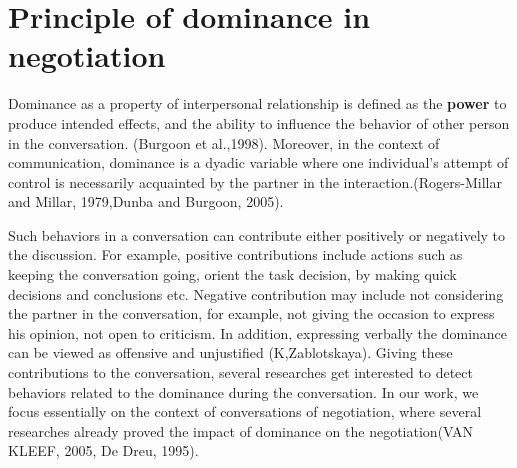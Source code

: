 \documentclass{article}
\begin{document}
%		
%		
	

	
	\section{Principle of dominance in negotiation}
	\par Dominance as a property of interpersonal relationship is defined as the \textbf{power} to produce intended effects, and the ability to influence the behavior of other person in the conversation. (Burgoon et al.,1998).
	Moreover, in the context of communication, dominance is a dyadic variable where one individual's attempt of control is necessarily acquainted by the partner in the interaction.(Rogers-Millar and Millar, 1979,Dunba and Burgoon, 2005). 
	
	\par Such behaviors in a conversation can contribute either positively or negatively to the discussion. For example, positive contributions include actions such as keeping the conversation going, orient the task decision, by making quick decisions and conclusions etc. Negative contribution may include not considering the partner in the conversation, for example, not giving the occasion to express his opinion, not open to criticism. In addition, expressing verbally the dominance can be viewed as offensive and unjustified (K,Zablotskaya). Giving these contributions to the conversation, several researches get interested to detect  behaviors related to the dominance during the conversation. In our work, we focus essentially on the context of conversations of negotiation, where several researches already proved the impact of dominance on the negotiation(VAN KLEEF, 2005, De Dreu, 1995). 
	
\end{document}
